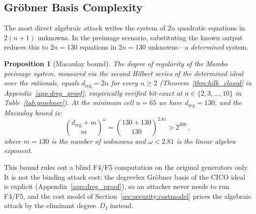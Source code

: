 \documentclass[11pt,a4paper]{article}
\newtheorem{proposition}[theorem]{Proposition}
\theoremstyle{definition}
\begin{document}
\subsection{Gr\"obner Basis Complexity}\label{sec:security:groebner}

The most direct algebraic attack writes the system of $2n$ quadratic
equations in $2(n+1)$ unknowns. In the preimage scenario, substituting the
known output reduces this to $2n = 130$ equations in $2n = 130$
unknowns---a \emph{determined} system.

\begin{proposition}[Macaulay bound]\label{prop:macaulay}
The degree of regularity of the Mambo preimage system, measured via the
second Hilbert series of the determined ideal over the rationals, equals
$d_{\mathrm{reg}} = 2n$ for every $n \ge 2$
(Theorem~\ref{thm:hilb_closed} in Appendix~\ref{app:dreg_proof};
empirically verified bit-exact at $n \in \{2, 3, \ldots, 10\}$ in
Table~\ref{tab:groebner}). At the minimum cell $n = 65$ we have
$d_{\mathrm{reg}} = 130$, and the Macaulay bound is:
\[
  \binom{d_{\mathrm{reg}} + m}{m}^\omega
  = \binom{130 + 130}{130}^{2.81} > 2^{300}\,,
\]
where $m = 130$ is the number of unknowns and $\omega < 2.81$ is the linear
algebra exponent.
\end{proposition}

This bound rules out a blind F4/F5 computation on the original
generators only. It is not the binding attack cost: the degrevlex
Gr\"obner basis of the CICO ideal is explicit
(Appendix~\ref{app:dreg_proof}), so an attacker never needs to run
F4/F5, and the cost model of Section~\ref{sec:security:costmodel}
prices the algebraic attack by the eliminant degree~$D_I$ instead.
\end{document}
